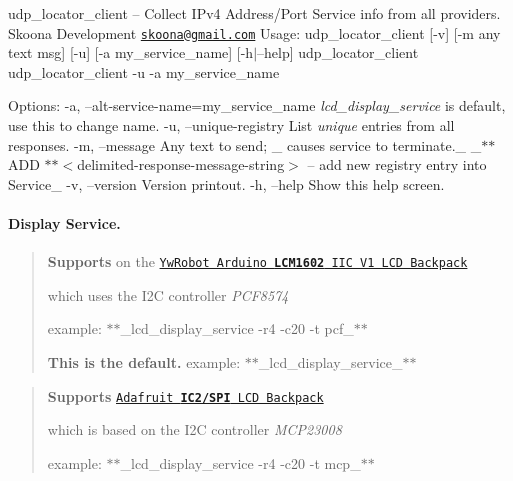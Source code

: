 udp\+\_\+locator\+\_\+client -- Collect I\+Pv4 Address/\+Port Service info from all providers. Skoona Development \href{mailto:skoona@gmail.com}{\tt skoona@gmail.\+com} Usage\+: udp\+\_\+locator\+\_\+client \mbox{[}-\/v\mbox{]} \mbox{[}-\/m \textquotesingle{}any text msg\textquotesingle{}\mbox{]} \mbox{[}-\/u\mbox{]} \mbox{[}-\/a \textquotesingle{}my\+\_\+service\+\_\+name\textquotesingle{}\mbox{]} \mbox{[}-\/h$\vert$--help\mbox{]} udp\+\_\+locator\+\_\+client udp\+\_\+locator\+\_\+client -\/u -\/a \textquotesingle{}my\+\_\+service\+\_\+name\textquotesingle{}

Options\+: -\/a, --alt-\/service-\/name=my\+\_\+service\+\_\+name {\itshape lcd\+\_\+display\+\_\+service} is default, use this to change name. -\/u, --unique-\/registry List {\itshape unique} entries from all responses. -\/m, --message Any text to send; \+\_\+\textquotesingle{} causes service to terminate.\+\_\+ \+\_\+\textquotesingle{}$\ast$$\ast$\+A\+DD $\ast$$\ast$$<$delimited-\/response-\/message-\/string$>$\textquotesingle{} -- add new registry entry into Service\+\_\+ -\/v, --version Version printout. -\/h, --help Show this help screen.

\paragraph*{Display Service.}



\begin{quote}
{\bfseries Supports} on the \href{http://arduino-info.wikispaces.com/LCD-Blue-I2C}{\tt \textquotesingle{}Yw\+Robot Arduino {\bfseries L\+C\+M1602} I\+IC V1 L\+CD Backpack\textquotesingle{}}
\begin{DoxyItemize}
\item which uses the I2C controller {\itshape P\+C\+F8574}
\item example\+: $\ast$$\ast$\+\_\+lcd\+\_\+display\+\_\+service -\/r4 -\/c20 -\/t pcf\+\_\+$\ast$$\ast$
\item {\bfseries This is the default.} example\+: $\ast$$\ast$\+\_\+lcd\+\_\+display\+\_\+service\+\_\+$\ast$$\ast$ 
\end{DoxyItemize}\end{quote}


\begin{quote}
{\bfseries Supports} \href{https://www.adafruit.com/products/292}{\tt \textquotesingle{}Adafruit {\bfseries I\+C2/\+S\+PI} L\+CD Backpack\textquotesingle{}}
\begin{DoxyItemize}
\item which is based on the I2C controller {\itshape M\+C\+P23008}
\item example\+: $\ast$$\ast$\+\_\+lcd\+\_\+display\+\_\+service -\/r4 -\/c20 -\/t mcp\+\_\+$\ast$$\ast$ 
\end{DoxyItemize}\end{quote}


